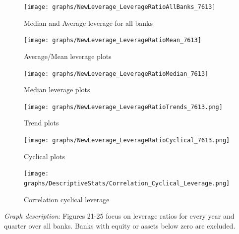\documentclass[12pt, a4paper]{article} %
\begin{document}
\begin{figure}[hbtp]
\centering
\caption{Median and Average leverage for all banks}
\texttt{[image: graphs/NewLeverage\_LeverageRatioAllBanks\_7613]}
\end{figure}

\newpage

\begin{figure}[hbtp]
\centering
\caption{Average/Mean leverage plots}
\texttt{[image: graphs/NewLeverage\_LeverageRatioMean\_7613]}
\end{figure}


\begin{figure}[hbtp]
\centering
\caption{Median leverage plots}
\texttt{[image: graphs/NewLeverage\_LeverageRatioMedian\_7613]}
\end{figure}

\newpage

\begin{figure}[hbtp]
\centering
\caption{Trend plots}
\texttt{[image: graphs/NewLeverage\_LeverageRatioTrends\_7613.png]}
\end{figure}


\begin{figure}[hbtp]
\centering
\caption{Cyclical plots}
\texttt{[image: graphs/NewLeverage\_LeverageRatioCyclical\_7613.png]}
\end{figure}

\newpage

\begin{figure}[hbtp]
\centering
\caption{Correlation cyclical leverage}
\texttt{[image: graphs/DescriptiveStats/Correlation\_Cyclical\_Leverage.png]}
\end{figure}

\noindent \textit{Graph description}: Figures 21-25 focus on leverage ratios for every year and quarter over all banks. Banks with equity or assets below zero are excluded.
\end{document}
